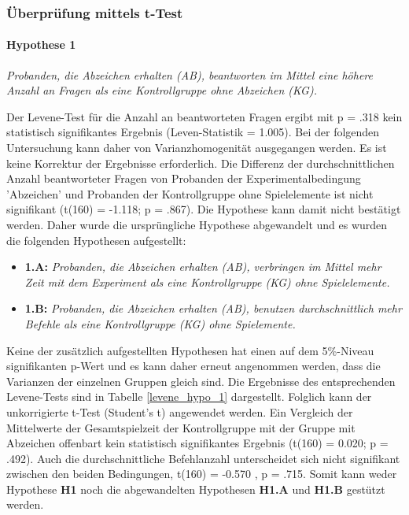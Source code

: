 \subsubsection{Überprüfung mittels t-Test}

\paragraph{Hypothese 1 }
\begin{center}
    \textit{Probanden, die Abzeichen erhalten (AB), beantworten im Mittel eine höhere Anzahl an Fragen als eine Kontrollgruppe ohne Abzeichen (KG).} 
\end{center}

Der Levene-Test für die Anzahl an beantworteten Fragen ergibt mit  p = .318 kein  statistisch  signifikantes  Ergebnis (Leven-Statistik = 1.005). Bei der folgenden Untersuchung kann daher von Varianzhomogenität ausgegangen werden. Es ist keine Korrektur der Ergebnisse erforderlich. Die Differenz der durchschnittlichen Anzahl beantworteter Fragen von Probanden der Experimentalbedingung 'Abzeichen' und Probanden der Kontrollgruppe ohne Spielelemente ist nicht signifikant (t(160) = -1.118; p = .867). Die Hypothese kann damit nicht bestätigt werden. Daher wurde die ursprüngliche Hypothese abgewandelt und es wurden die folgenden Hypothesen aufgestellt:

\begin{itemize}
    \item \textbf{1.A:} \textit{Probanden, die Abzeichen erhalten (AB), verbringen im Mittel mehr Zeit mit dem Experiment als eine Kontrollgruppe (KG) ohne Spielelemente.}
    \item \textbf{1.B:} \textit{Probanden, die Abzeichen erhalten (AB), benutzen durchschnittlich mehr Befehle als eine Kontrollgruppe (KG) ohne Spielemente.} 
\end{itemize}

Keine der zusätzlich aufgestellten Hypothesen hat einen auf dem 5\%-Niveau signifikanten p-Wert und es kann daher erneut angenommen werden, dass die Varianzen der einzelnen Gruppen gleich sind. Die Ergebnisse des entsprechenden Levene-Tests sind in Tabelle \ref{levene_hypo_1} dargestellt. Folglich kann der unkorrigierte t-Test (Student's t) angewendet werden. Ein Vergleich  der  Mittelwerte  der Gesamtspielzeit der Kontrollgruppe mit der Gruppe mit Abzeichen offenbart kein statistisch signifikantes Ergebnis (t(160) = 0.020; p = .492). Auch die durchschnittliche Befehlanzahl unterscheidet sich nicht signifikant zwischen den beiden Bedingungen, t(160) = -0.570 , p = .715. Somit kann weder Hypothese \textbf{H1} noch die abgewandelten Hypothesen \textbf{H1.A} und \textbf{H1.B} gestützt werden.


